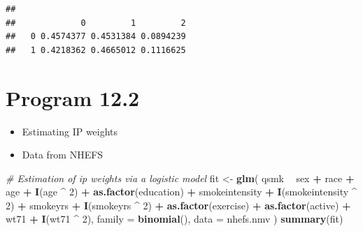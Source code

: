\documentclass[
  10pt,
]{book}
\newenvironment{Shaded}{\begin{snugshade}}{\end{snugshade}}
\newcommand{\CommentTok}[1]{\textcolor[rgb]{0.56,0.35,0.01}{\textit{#1}}}
\newcommand{\DataTypeTok}[1]{\textcolor[rgb]{0.13,0.29,0.53}{#1}}
\newcommand{\DecValTok}[1]{\textcolor[rgb]{0.00,0.00,0.81}{#1}}
\newcommand{\KeywordTok}[1]{\textcolor[rgb]{0.13,0.29,0.53}{\textbf{#1}}}
\newcommand{\NormalTok}[1]{#1}
\newcommand{\OperatorTok}[1]{\textcolor[rgb]{0.81,0.36,0.00}{\textbf{#1}}}
\newcommand{\StringTok}[1]{\textcolor[rgb]{0.31,0.60,0.02}{#1}}
\providecommand{\tightlist}{%
  \setlength{\itemsep}{0pt}\setlength{\parskip}{0pt}}
\begin{document}
\begin{verbatim}
##    
##             0         1         2
##   0 0.4574377 0.4531384 0.0894239
##   1 0.4218362 0.4665012 0.1116625
\end{verbatim}

\hypertarget{program-12.2}{%
\section{Program 12.2}\label{program-12.2}}

\begin{itemize}
\tightlist
\item
  Estimating IP weights
\item
  Data from NHEFS
\end{itemize}

\begin{Shaded}
\begin{Highlighting}[]
\CommentTok{# Estimation of ip weights via a logistic model}
\NormalTok{fit <-}\StringTok{ }\KeywordTok{glm}\NormalTok{(}
\NormalTok{  qsmk }\OperatorTok{~}\StringTok{ }\NormalTok{sex }\OperatorTok{+}\StringTok{ }\NormalTok{race }\OperatorTok{+}\StringTok{ }\NormalTok{age }\OperatorTok{+}\StringTok{ }\KeywordTok{I}\NormalTok{(age }\OperatorTok{^}\StringTok{ }\DecValTok{2}\NormalTok{) }\OperatorTok{+}
\StringTok{    }\KeywordTok{as.factor}\NormalTok{(education) }\OperatorTok{+}\StringTok{ }\NormalTok{smokeintensity }\OperatorTok{+}
\StringTok{    }\KeywordTok{I}\NormalTok{(smokeintensity }\OperatorTok{^}\StringTok{ }\DecValTok{2}\NormalTok{) }\OperatorTok{+}\StringTok{ }\NormalTok{smokeyrs }\OperatorTok{+}\StringTok{ }\KeywordTok{I}\NormalTok{(smokeyrs }\OperatorTok{^}\StringTok{ }\DecValTok{2}\NormalTok{) }\OperatorTok{+}
\StringTok{    }\KeywordTok{as.factor}\NormalTok{(exercise) }\OperatorTok{+}\StringTok{ }\KeywordTok{as.factor}\NormalTok{(active) }\OperatorTok{+}\StringTok{ }\NormalTok{wt71 }\OperatorTok{+}\StringTok{ }\KeywordTok{I}\NormalTok{(wt71 }\OperatorTok{^}\StringTok{ }\DecValTok{2}\NormalTok{),}
  \DataTypeTok{family =} \KeywordTok{binomial}\NormalTok{(),}
  \DataTypeTok{data =}\NormalTok{ nhefs.nmv}
\NormalTok{)}
\KeywordTok{summary}\NormalTok{(fit)}
\end{Highlighting}
\end{Shaded}
\end{document}
